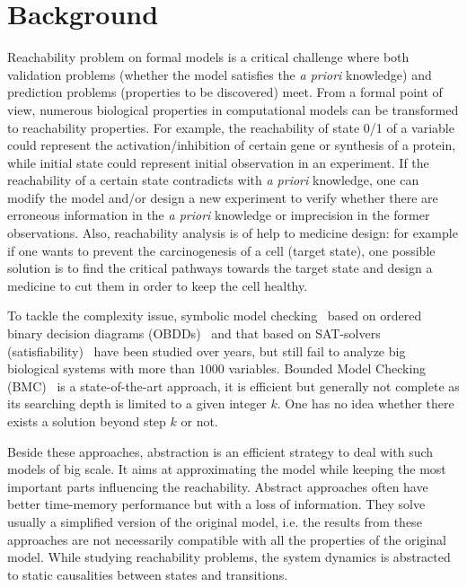 \section{Background}
Reachability problem on formal models is a critical challenge where both validation problems (whether the model satisfies the \textit{a priori} knowledge) and prediction problems (properties to be discovered) meet. 
From a formal point of view, numerous biological properties in computational models can be transformed to reachability properties. 
For example, the reachability of state 0/1 of a variable could represent the activation/inhibition of certain gene or synthesis of a protein, while initial state could represent initial observation in an experiment.
If the reachability of a certain state contradicts with \textit{a priori} knowledge, one can modify the model and/or design a new experiment to verify whether there are erroneous information in the \textit{a priori} knowledge or imprecision in the former observations.
Also, reachability analysis is of help to medicine design: for example if one wants to prevent the carcinogenesis of a cell (target state), one possible solution is to find the critical pathways towards the target state and design a medicine to cut them in order to keep the cell healthy.

To tackle the complexity issue, symbolic model checking~\cite{burch1992symbolic} based on ordered binary decision diagrams (OBDDs)~\cite{hardin1997new} and that based on SAT-solvers (satisfiability)~\cite{abdulla2000symbolic} have been studied over years, but still fail to analyze big biological systems with more than $1000$ variables. 
Bounded Model Checking (BMC)~\cite{clarke2001bounded} is a state-of-the-art approach, it is efficient but generally not complete as its searching depth is limited to a given integer $k$.
One has no idea whether there exists a solution beyond step $k$ or not.

Beside these approaches, abstraction is an efficient strategy to deal with such models of big scale. 
It aims at approximating the model while keeping the most important parts influencing the reachability.
Abstract approaches often have better time-memory performance but with a loss of information. 
They solve usually a simplified version of the original model, i.e. the results from these approaches are not necessarily compatible with all the properties of the original model.
While studying reachability problems, the system dynamics is abstracted to static causalities between states and transitions.

